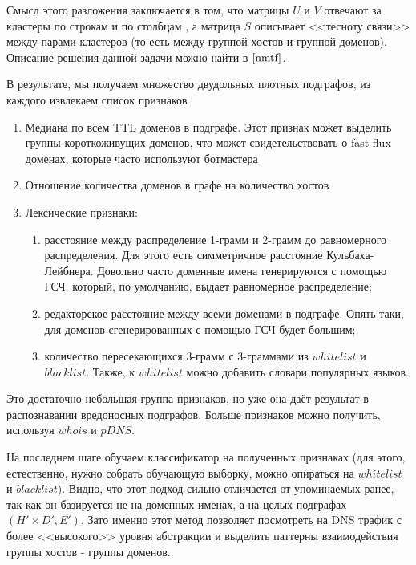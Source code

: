 \documentclass[a4paper,14pt]{extreport} %
\begin{document}
Смысл этого разложения заключается в том, что матрицы $U$ и $V$ отвечают за кластеры по строкам и по столбцам , а матрица $S$ описывает <<тесноту связи>> между парами кластеров (то есть между группой хостов и группой доменов). Описание решения данной задачи можно найти в $\cite{nmtf}$.
	
В результате, мы получаем множество двудольных плотных подграфов, из каждого извлекаем список признаков
	
\begin{enumerate}
	\item Медиана по всем TTL доменов в подграфе. Этот признак может выделить группы короткоживущих доменов, что может свидетельствовать о fast-flux доменах, которые часто используют ботмастера
	\item Отношение количества доменов в графе на количество хостов
	\item Лексические признаки:
	      \begin{enumerate}[а)]
	      
	      	\item расстояние между распределение 1-грамм и 2-грамм до равномерного распределения. Для этого есть симметричное расстояние Кульбаха-Лейбнера. Довольно часто доменные имена генерируются с помощью ГСЧ, который, по умолчанию, выдает равномерное распределение;
	      	\item редакторское расстояние между всеми доменами в подграфе. Опять таки, для доменов сгенерированных с помощью ГСЧ будет большим;
	      	\item количество пересекающихся 3-грамм с 3-граммами из $whitelist$ и $blacklist$. Также, к $whitelist$ можно добавить словари популярных языков.
	      \end{enumerate}
\end{enumerate}  

Это достаточно небольшая группа признаков, но уже она даёт результат в распознавании вредоносных подграфов. Больше признаков можно получить, используя $whois$ и $pDNS$.
	
На последнем шаге обучаем классификатор на полученных признаках (для этого, естественно, нужно собрать обучающую выборку, можно опираться на $whitelist$ и $blacklist$). Видно, что этот подход сильно отличается от упоминаемых ранее, так как он базируется не на доменных именах, а на целых подграфах $(H' \times D', E')$. Зато именно этот метод позволяет посмотреть на DNS трафик с более <<высокого>> уровня абстракции и выделить паттерны взаимодействия группы хостов - группы доменов.
	
\end{document}
